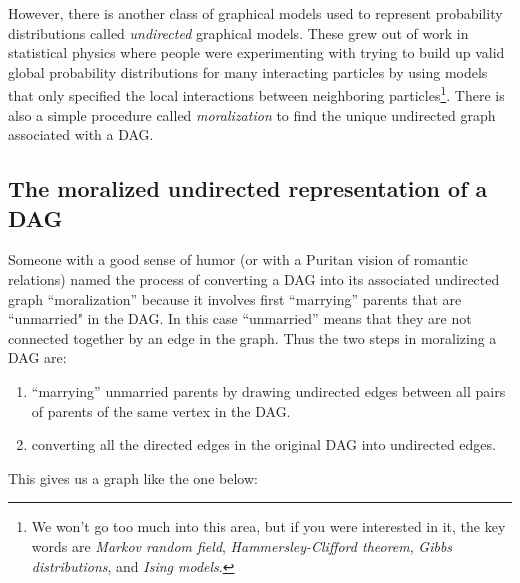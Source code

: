 \documentclass[11pt]{article}
\begin{document}
However, there is another class of graphical models used to represent probability distributions
called {\em undirected} graphical models.  These grew out of work in statistical physics where
people were experimenting with trying to build up valid global probability distributions for
many interacting particles by using models that only specified the local interactions between
neighboring particles\footnote{We won't go too much into this area, but if you were interested
in it, the key words are {\em Markov random field}, {\em Hammersley-Clifford theorem}, {\em Gibbs distributions}, and {\em Ising models}.}.  
There is also a simple procedure called {\em moralization} to find the unique undirected graph
associated with a DAG.

\subsection{The moralized undirected representation of a DAG}
Someone with a good sense of humor (or with a Puritan vision of romantic relations) named the process of converting a DAG into
its associated undirected graph ``moralization'' because it involves first
``marrying'' parents that are ``unmarried" in the DAG\@.  In this case
``unmarried'' means that they are not connected together by an edge in the
graph.  Thus the two steps in moralizing a DAG are:
\begin{enumerate}
\item ``marrying'' unmarried parents by drawing undirected edges between all pairs of 
parents of the same vertex in the DAG.
\item converting all the directed edges in the original DAG into undirected edges.
\end{enumerate}
This gives us a graph like the one below:
\end{document}
